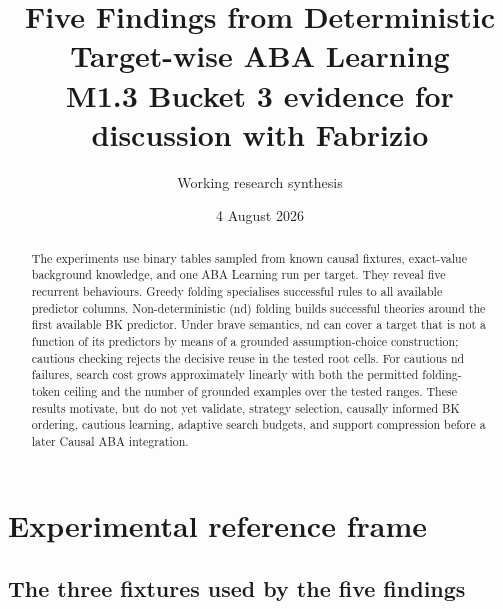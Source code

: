 \documentclass[11pt]{article}
\title{Five Findings from Deterministic Target-wise ABA Learning\\[0.35em]
\large M1.3 Bucket 3 evidence for discussion with Fabrizio}
\author{Working research synthesis}
\date{4 August 2026}
\begin{document}
\maketitle

\begin{center}
\end{center}

\begin{abstract}
The experiments use binary tables sampled from known causal fixtures, exact-value
background knowledge, and one ABA Learning run per target. They reveal five
recurrent behaviours. Greedy folding specialises successful rules to all
available predictor columns. Non-deterministic (nd) folding builds successful
theories around the first available BK predictor. Under brave semantics, nd can
cover a target that is not a function of its predictors by means of a grounded
assumption-choice construction; cautious checking rejects the decisive reuse in
the tested root cells. For cautious nd failures, search cost grows approximately
linearly with both the permitted folding-token ceiling and the number of grounded
examples over the tested ranges. These results motivate, but do not yet validate,
strategy selection, causally informed BK ordering, cautious learning, adaptive
search budgets, and support compression before a later Causal ABA integration.
\end{abstract}

\tableofcontents
\newpage

\section{Experimental reference frame}

\subsection{The three fixtures used by the five findings}
\end{document}
